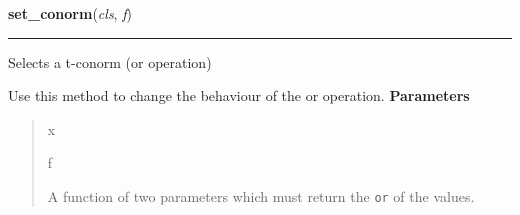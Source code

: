     \label{peach:fuzzy:base:FuzzySet:set_conorm}

    \vspace{0.5ex}

\hspace{.8\funcindent}\begin{boxedminipage}{\funcwidth}

    \raggedright \textbf{set\_conorm}(\textit{cls}, \textit{f})

    \vspace{-1.5ex}

    \rule{\textwidth}{0.5\fboxrule}
\setlength{\parskip}{2ex}

Selects a t-conorm (or operation)

Use this method to change the behaviour of the or operation.
\setlength{\parskip}{1ex}
      \textbf{Parameters}
      \vspace{-1ex}

      \begin{quote}
        \begin{Ventry}{x}

          \item[f]


A function of two parameters which must return the \texttt{or} of the
values.
        \end{Ventry}

      \end{quote}

    \end{boxedminipage}

    \label{peach:fuzzy:base:FuzzySet:set_negation}

    \vspace{0.5ex}

